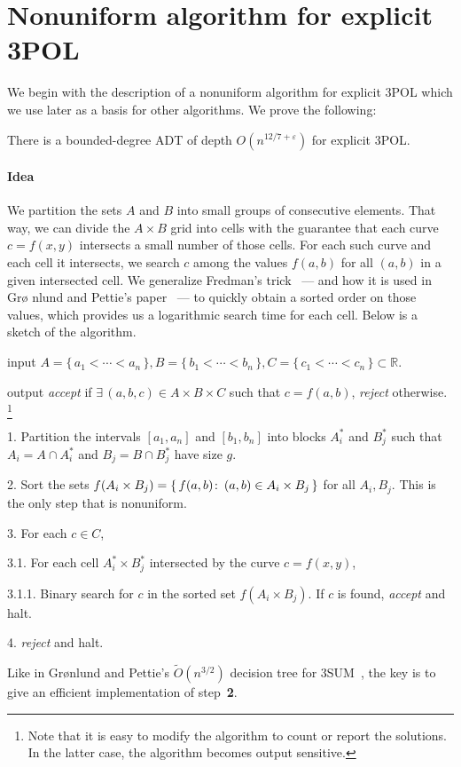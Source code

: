 \section{Nonuniform algorithm for explicit 3POL}%
\label{sec:algo:explicit:nonuniform}

We begin with the description of a nonuniform algorithm for explicit 3POL which
we use later as a basis for other algorithms. We prove the following:
\begin{theorem}\label{thm:explicit:act}
	There is a bounded-degree ADT of depth
	$O(n^{12/7+\varepsilon})$
	for explicit 3POL\@.
\end{theorem}

\paragraph{Idea}
We partition the sets $A$ and $B$ into small groups of consecutive
elements. That way, we can divide the $A\times B$ grid into cells with the
guarantee that each curve $c = f(x,y)$ intersects a small number
of those cells. For each such curve and each cell it intersects, we
search $c$ among the values $f(a,b)$ for all $(a,b)$ in a given intersected
cell. We generalize Fredman's trick~\cite{F76} --- and how it is used in Gr\o
nlund and Pettie's paper~\cite{GP14} --- to quickly obtain a sorted order on
those values, which provides us a logarithmic search time for each cell.
Below is a sketch of the algorithm.
\begin{algorithm}\label{algo:ne}
\item[input] $A = \{\,a_1 < \cdots < a_n\,\},B = \{\,b_1<\cdots<b_n\,\},
    C = \{\,c_1<\cdots<c_n\,\}
    \subset \mathbb{R}$.
\item[output] \emph{accept} if $\exists\, (a,b,c) \in A \times B \times C$ such that $c
    = f(a,b)$, \emph{reject} otherwise.%
    \footnote{Note that it is easy to modify the algorithm to count or report the
    solutions. In the latter case, the algorithm becomes output sensitive.}
\item[1.] Partition the intervals $[a_1,a_n]$ and $[b_1,b_n]$ into blocks
    $A_i^*$ and $B_j^*$ such that $A_i = A \cap A_i^*$ and $B_j = B
    \cap B_j^*$ have size $g$.
\item[2.] Sort the sets $f(A_i \times B_j) = \{\, f(a,b) \colon\, (a,b) \in A_i
    \times B_j\,\}$ for all $A_i,B_j$. This is the only step that
    is nonuniform.
\item[3.] For each $c \in C$,
\item[3.1.] For each cell $A_i^* \times B_j^*$ intersected by the curve
$c=f(x,y)$,
\item[3.1.1.] Binary search for $c$ in the sorted set $f(A_i \times B_j)$.
If $c$ is found, \emph{accept} and halt.
\item[4.] \emph{reject} and halt.
\end{algorithm}
%
Like in Gr\o nlund and Pettie's $\tilde{O}(n^{3/2})$ decision tree for
3SUM~\cite{GP14}, the key is to give an efficient implementation
of step~\textbf{2}.

